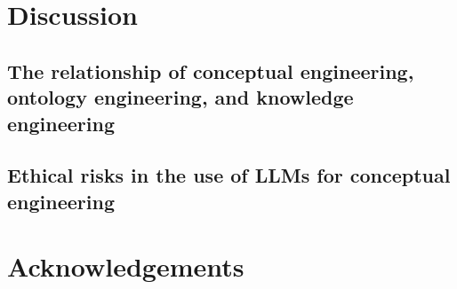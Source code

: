 \documentclass{article}
\begin{document}
\section{Discussion}

\subsection{The relationship of conceptual engineering, ontology engineering, and knowledge engineering}

\subsection{Ethical risks in the use of LLMs for conceptual engineering}

\section{Acknowledgements}

\nocite{*}



\end{document}
